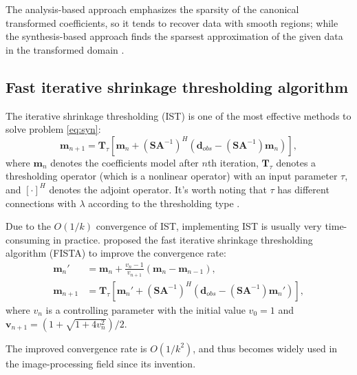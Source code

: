 The analysis-based approach emphasizes the sparsity of the
canonical transformed coefficients, so it tends to recover data with
smooth regions; while the synthesis-based approach finds the
sparsest approximation of the given data in the transformed domain \cite[]{jianwei2014}.

\subsection{Fast iterative shrinkage thresholding algorithm}
The iterative shrinkage thresholding (IST) is one of the most effective methods to solve problem \ref{eq:syn}:
\begin{equation}
\label{eq:ist}
\mathbf{m}_{n+1} = \mathbf{T}_{\tau}\left[\mathbf{m}_{n} + (\mathbf{S}\mathbf{A}^{-1})^H(\mathbf{d}_{obs}-(\mathbf{S}\mathbf{A}^{-1})\mathbf{m}_n)\right],
\end{equation}
where $\mathbf{m}_n$ denotes the coefficients model after $n$th iteration, $\mathbf{T}_{\tau}$ denotes a thresholding operator (which is a nonlinear operator) with an input parameter $\tau$, and $[\cdot]^H$ denotes the adjoint operator. It's worth noting that $\tau$ has different connections with $\lambda$ according to the thresholding type \cite[]{yangkang2014halfthr}.

Due to the $O(1/k)$ convergence of IST, implementing IST is usually very time-consuming in practice. \cite{beck2009} proposed the fast iterative shrinkage thresholding algorithm (FISTA) to improve the convergence rate:
\begin{equation}
\begin{split}
\mathbf{m}_{n}'  &= \mathbf{m}_n + \frac{v_n-1}{v_{n+1}}(\mathbf{m}_n-\mathbf{m}_{n-1}), \\
\mathbf{m}_{n+1} &= \mathbf{T}_{\tau}\left[\mathbf{m}_{n}' + (\mathbf{S}\mathbf{A}^{-1})^H\left(\mathbf{d}_{obs}-(\mathbf{S}\mathbf{A}^{-1})\mathbf{m}_n'\right)\right],
\end{split}
\end{equation}
where $v_n$ is a controlling parameter with the initial value $v_0=1$ and $\mathbf{v}_{n+1}=(1+\sqrt{1+4v_n^2})/2$. 

The improved convergence rate is $O(1/k^2)$, and thus becomes widely used in the image-processing field since its invention.


